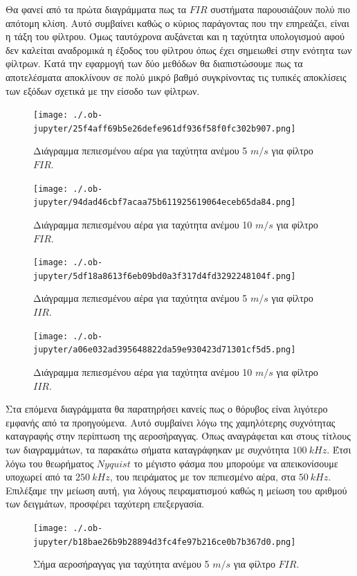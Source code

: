 \documentclass[breaklines=true, 12pt]{article}
\begin{document}
{{{Θα φανεί από τα πρώτα διαγράμματα πως τα \(FIR\) συστήματα παρουσιάζουν πολύ
πιο απότομη κλίση. Αυτό συμβαίνει καθώς ο κύριος παράγοντας που την επηρεάζει,
είναι η τάξη του φίλτρου. Όμως ταυτόχρονα αυξάνεται και η ταχύτητα υπολογισμού
αφού δεν καλείται αναδρομικά η έξοδος του φίλτρου όπως έχει σημειωθεί στην
ενότητα των φίλτρων. Κατά την εφαρμογή των δύο μεθόδων θα διαπιστώσουμε πως τα
αποτελέσματα αποκλίνουν σε πολύ μικρό βαθμό συγκρίνοντας τις τυπικές
αποκλίσεις των εξόδων σχετικά με την είσοδο των φίλτρων.

\begin{figure}[htbp]
\centering
\texttt{[image: ./.ob-jupyter/25f4aff69b5e26defe961df936f58f0fc302b907.png]}
\caption{\label{fc1_5}Διάγραμμα πεπιεσμένου αέρα για ταχύτητα ανέμου 5 \(m/s\) για φίλτρο \(FIR\).}
\end{figure}

\begin{figure}[htbp]
\centering
\texttt{[image: ./.ob-jupyter/94dad46cbf7acaa75b611925619064eceb65da84.png]}
\caption{\label{fc1_10_ref}Διάγραμμα πεπιεσμένου αέρα για ταχύτητα ανέμου 10 \(m/s\) για φίλτρο \(FIR\).}
\end{figure}

\begin{figure}[htbp]
\centering
\texttt{[image: ./.ob-jupyter/5df18a8613f6eb09bd0a3f317d4fd3292248104f.png]}
\caption{\label{ic1_5}Διάγραμμα πεπιεσμένου αέρα για ταχύτητα ανέμου 5 \(m/s\) για φίλτρο \(IIR\).}
\end{figure}

\begin{figure}[H]
\centering
\texttt{[image: ./.ob-jupyter/a06e032ad395648822da59e930423d71301cf5d5.png]}
\caption{\label{ic1_10}Διάγραμμα πεπιεσμένου αέρα για ταχύτητα ανέμου 10 \(m/s\) για φίλτρο \(IIR\).}
\end{figure}

Στα επόμενα διαγράμματα θα παρατηρήσει κανείς πως ο θόρυβος είναι λιγότερο εμφανής από τα
προηγούμενα. Αυτό συμβαίνει λόγω της χαμηλότερης συχνότητας
καταγραφής στην περίπτωση της αεροσήραγγας. Όπως αναγράφεται και στους
τίτλους των διαγραμμάτων, τα παρακάτω σήματα καταγράφηκαν με συχνότητα
\(100\ kHz\). Έτσι λόγω του θεωρήματος \(Nyquist\) το μέγιστο φάσμα που
μπορούμε να απεικονίσουμε υποχωρεί από τα \(250\ kHz\), του πειράματος με
τον πεπιεσμένο αέρα, στα \(50\ kHz\). Επιλέξαμε την μείωση αυτή, για
λόγους πειραματισμού καθώς η μείωση του αριθμού των δειγμάτων, προσφέρει
ταχύτερη επεξεργασία.
\begin{figure}[b]
\centering
\texttt{[image: ./.ob-jupyter/b18bae26b9b28894d3fc4fe97b216ce0b7b367d0.png]}
\caption{\label{fi1_5}Σήμα αεροσήραγγας για ταχύτητα ανέμου 5 \(m/s\) για φίλτρο \(FIR\).}
\end{figure}

}}}
\end{document}
